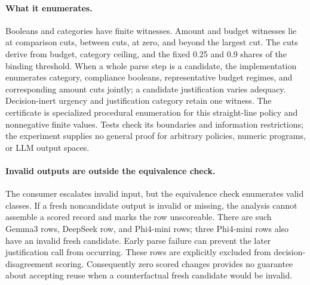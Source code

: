 \paragraph{What it enumerates.}
Booleans and categories have finite witnesses. Amount and budget witnesses lie at comparison cuts, between cuts, at zero, and beyond the largest cut. The cuts derive from budget, category ceiling, and the fixed 0.25 and 0.9 shares of the binding threshold. When a whole parse step is a candidate, the implementation enumerates category, compliance booleans, representative budget regimes, and corresponding amount cuts jointly; a candidate justification varies adequacy. Decision-inert urgency and justification category retain one witness. The certificate is specialized procedural enumeration for this straight-line policy and nonnegative finite values. Tests check its boundaries and information restrictions; the experiment supplies no general proof for arbitrary policies, numeric programs, or LLM output spaces.

\paragraph{Invalid outputs are outside the equivalence check.}
The consumer escalates invalid input, but the equivalence check enumerates valid classes. If a fresh noncandidate output is invalid or missing, the analysis cannot assemble a scored record and marks the row unscoreable. There are \absChainGmEeightUnscoreable{} such Gemma3 rows, \absChainDsEeightUnscoreable{} DeepSeek row, and \absChainPhEeightUnscoreable{} Phi4-mini rows; three Phi4-mini rows also have an invalid fresh candidate. Early parse failure can prevent the later justification call from occurring. These rows are explicitly excluded from decision-disagreement scoring. Consequently zero scored changes provides no guarantee about accepting reuse when a counterfactual fresh candidate would be invalid.

